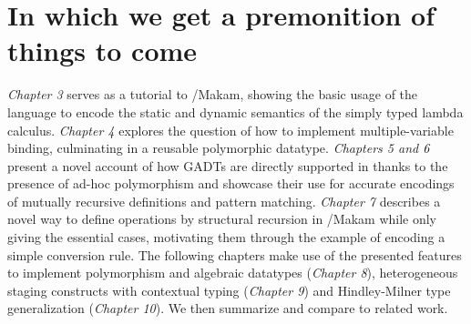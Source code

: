 \section{In which we get a premonition of things to
come}\label{in-which-we-get-a-premonition-of-things-to-come}

\identNormal

\emph{Chapter 3} serves as a tutorial to \lamprolog/Makam, showing the
basic usage of the language to encode the static and dynamic semantics
of the simply typed lambda calculus. \emph{Chapter 4} explores the
question of how to implement multiple-variable binding, culminating in a
reusable polymorphic datatype. \emph{Chapters 5 and 6} present a novel
account of how GADTs are directly supported in \lamprolog thanks to the
presence of ad-hoc polymorphism and showcase their use for accurate
encodings of mutually recursive definitions and pattern matching.
\emph{Chapter 7} describes a novel way to define operations by
structural recursion in \lamprolog/Makam while only giving the essential
cases, motivating them through the example of encoding a simple
conversion rule. The following chapters make use of the presented
features to implement polymorphism and algebraic datatypes
(\emph{Chapter 8}), heterogeneous staging constructs with contextual
typing (\emph{Chapter 9}) and Hindley-Milner type generalization
(\emph{Chapter 10}). We then summarize and compare to related work.

\identDialog
